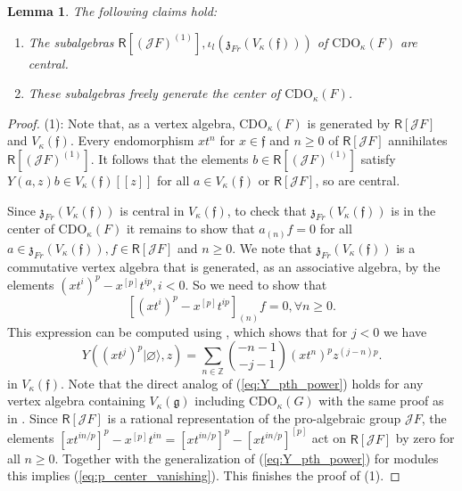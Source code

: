 \documentclass{amsart}
\newtheorem{Lem}[Thm]{Lemma}
\theoremstyle{definition}
\newcommand{\Ring}{\mathsf{R}}
\newcommand{\g}{\mathfrak{g}}
\newcommand{\Z}{\mathbb{Z}}
\newcommand{\Jet}{\mathscr{J}}
\newcommand{\ff}{\mathfrak{f}}
\newcommand{\CDO}{\mathrm{CDO}}
\numberwithin{equation}{section}
\begin{document}
\begin{Lem}\label{Lem:CDO_p_center}
The following claims hold:
\begin{enumerate}
\item 
The subalgebras $\Ring[(\Jet F)^{(1)}],\iota_l(\mathfrak{z}_{Fr}(V_\kappa(\ff)))$
of $\CDO_\kappa(F)$ are central.
\item These subalgebras freely generate the center of $\CDO_\kappa(F)$. 
\end{enumerate}
\end{Lem}
\begin{proof}
(1): Note that, as a vertex algebra, $\CDO_\kappa(F)$ is generated by $\Ring[\Jet F]$
and $V_\kappa(\ff)$. Every endomorphism $xt^n$ for $x\in \ff$ and $n\geqslant 0$ of $\Ring[\Jet F]$ annihilates $\Ring[(\Jet F)^{(1)}]$. It follows that the elements $b\in \Ring[(\Jet F)^{(1)}]$ satisfy $Y(a,z)b\in V_\kappa(\ff)[[z]]$ for all $a\in V_\kappa(\ff)$
or $\Ring[\Jet F]$, so are central. 

Since $\mathfrak{z}_{Fr}(V_\kappa(\ff))$ is central in $V_\kappa(\ff)$, to check that $\mathfrak{z}_{Fr}(V_\kappa(\ff))$ is in the center of $\CDO_\kappa(F)$ it remains to show that $a_{(n)}f=0$ for all $a\in \mathfrak{z}_{Fr}(V_\kappa(\ff)),f\in \Ring[\Jet F]$ and $n\geqslant 0$. We note that $\mathfrak{z}_{Fr}(V_\kappa(\ff))$ is a commutative vertex algebra that is generated, as an associative algebra, by the elements $(xt^i)^p-x^{[p]}t^{ip}, i<0$. So we need to show that 
\begin{equation}\label{eq:p_center_vanishing}
[(xt^i)^p-x^{[p]}t^{ip}]_{(n)}f=0,  \forall n\geqslant 0.\end{equation}
This expression can be computed using \cite[Lemma 2.3]{AW}, which shows that for $j<0$ we have
\begin{equation}\label{eq:Y_pth_power}
Y((xt^{j})^p|\varnothing\rangle, z)=\sum_{n\in \Z}{-n-1\choose -j-1}(xt^n)^p z^{(j-n)p}.
\end{equation}
in $V_\kappa(\mathfrak{f})$. 
Note that the direct analog of (\ref{eq:Y_pth_power}) holds for any vertex algebra containing $V_\kappa(\g)$ including $\CDO_\kappa(G)$ with the same proof as in \cite{AW}. Since $\Ring[\Jet F]$ is a rational representation of the pro-algebraic group $\Jet F$, the elements $[xt^{in/p}]^p-x^{[p]}t^{in}=[xt^{in/p}]^p-[xt^{in/p}]^{[p]}$ act on $\Ring[\Jet F]$ by zero for all $n\geqslant 0$. Together with the generalization of
(\ref{eq:Y_pth_power}) for modules this implies (\ref{eq:p_center_vanishing}). This finishes the proof of (1).


\end{proof}
\end{document}
